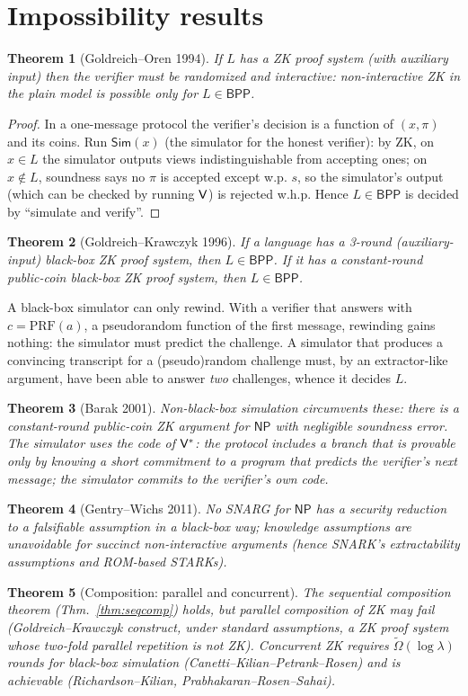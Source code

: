 \documentclass[11pt,a4paper]{report}
\theoremstyle{plain}
\newtheorem{theorem}{Theorem}[chapter]
\theoremstyle{definition}
\theoremstyle{remark}
\newcommand{\Sim}{\mathsf{Sim}}\newcommand{\Ext}{\mathsf{Ext}}
\newcommand{\NP}{\mathsf{NP}}\newcommand{\BPP}{\mathsf{BPP}}\newcommand{\IP}{\mathsf{IP}}
\begin{document}
\section{Impossibility results}
\begin{theorem}[Goldreich--Oren 1994]
If $L$ has a ZK proof system (with auxiliary input) then the verifier must be randomized and interactive: non-interactive ZK in the plain model is possible only for $L\in\BPP$.
\end{theorem}
\begin{proof}
In a one-message protocol the verifier's decision is a function of $(x,\pi)$ and its coins. Run $\Sim(x)$ (the simulator for the honest verifier): by ZK, on $x\in L$ the simulator outputs views indistinguishable from accepting ones; on $x\notin L$, soundness says no $\pi$ is accepted except w.p. $s$, so the simulator's output (which can be checked by running $\mathsf{V}$) is rejected w.h.p. Hence $L\in\BPP$ is decided by ``simulate and verify''.
\end{proof}
\begin{theorem}[Goldreich--Krawczyk 1996]
If a language has a 3-round (auxiliary-input) black-box ZK proof system, then $L\in\BPP$. If it has a constant-round public-coin black-box ZK proof system, then $L\in\BPP$.
\end{theorem}
\begin{intuition}
A black-box simulator can only rewind. With a verifier that answers with $c=\mathrm{PRF}(a)$, a pseudorandom function of the first message, rewinding gains nothing: the simulator must predict the challenge. A simulator that produces a convincing transcript for a (pseudo)random challenge must, by an extractor-like argument, have been able to answer \emph{two} challenges, whence it decides $L$.
\end{intuition}
\begin{theorem}[Barak 2001]
Non-black-box simulation circumvents these: there is a constant-round public-coin ZK argument for $\NP$ with negligible soundness error. The simulator uses the \emph{code} of $\mathsf{V}^*$: the protocol includes a branch that is provable only by knowing a short commitment to a program that predicts the verifier's next message; the simulator commits to the verifier's own code.
\end{theorem}
\begin{theorem}[Gentry--Wichs 2011]
No SNARG for $\NP$ has a security reduction to a falsifiable assumption in a black-box way; knowledge assumptions are unavoidable for succinct non-interactive \emph{arguments} (hence SNARK's extractability assumptions and ROM-based STARKs).
\end{theorem}
\begin{theorem}[Composition: parallel and concurrent]
The sequential composition theorem (Thm.~\ref{thm:seqcomp}) holds, but parallel composition of ZK may fail (Goldreich--Krawczyk construct, under standard assumptions, a ZK proof system whose two-fold parallel repetition is not ZK). Concurrent ZK requires $\tilde\Omega(\log\lambda)$ rounds for black-box simulation (Canetti--Kilian--Petrank--Rosen) and is achievable (Richardson--Kilian, Prabhakaran--Rosen--Sahai).
\end{theorem}
\end{document}
